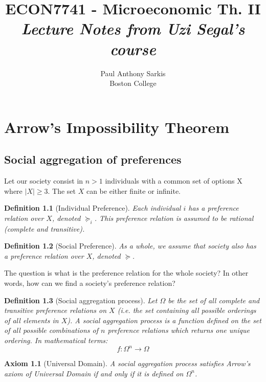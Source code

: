 \documentclass[12pt]{report}
\newtheorem{definition}{Definition}[chapter]
\newtheorem{axiom}{Axiom}[chapter]
\begin{document}
\date{}
\title{\textbf{ECON7741 - Microeconomic Th. II}\\ \textit{Lecture Notes from Uzi Segal's course}}
\author{Paul Anthony Sarkis\\ Boston College} 
 
\maketitle

\tableofcontents

\chapter{Arrow's Impossibility Theorem}

\section{Social aggregation of preferences} 

Let our society consist in $n>1$ individuals with a common set of options X where $|X|\geq 3$. The set $X$ can be either finite or infinite. 

\begin{definition}[Individual Preference]
Each individual $i$ has a preference relation over $X$, denoted $\succeq_i$. This preference relation is assumed to be rational (complete and transitive).
\end{definition} 

\begin{definition}[Social Preference]
As a whole, we assume that society also has a preference relation over $X$, denoted $\succeq$.
\end{definition}

The question is what is the preference relation for the whole society? In other words, how can we find a society's preference relation?

\begin{definition}[Social aggregation process]
Let $\Omega$ be the set of all complete and transitive preference relations on $X$ (i.e. the set containing all possible orderings of all elements in $X$). A social aggregation process is a function defined on the set of all possible combinations of $n$ preference relations which returns one unique ordering. In mathematical terms: $$f:\Omega^n \to \Omega $$
\end{definition}

\begin{axiom}[Universal Domain]
A social aggregation process satisfies Arrow's axiom of Universal Domain if and only if it is defined on $\Omega^n$.
\end{axiom}
\end{document}

